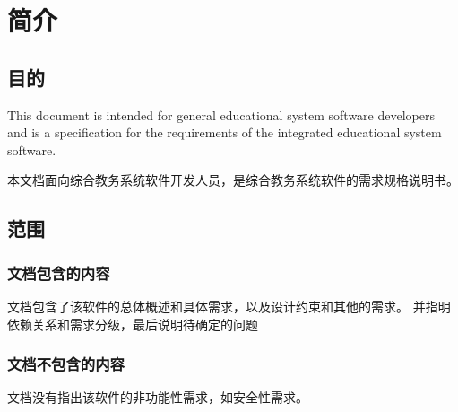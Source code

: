 \chapter{简介}
\section{目的}
This document is intended for general educational system software developers and is a specification for the requirements of the integrated educational system software.

本文档面向综合教务系统软件开发人员，是综合教务系统软件的需求规格说明书。

\section{范围}


\subsection{文档包含的内容}

文档包含了该软件的总体概述和具体需求，以及设计约束和其他的需求。
并指明依赖关系和需求分级，最后说明待确定的问题

\subsection{文档不包含的内容}

文档没有指出该软件的非功能性需求，如安全性需求。